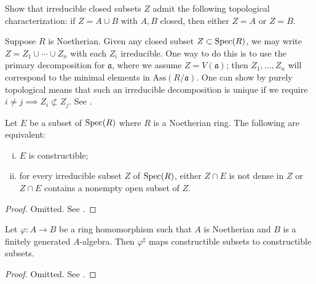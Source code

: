 \begin{exercise}
	Show that irreducible closed subsets $Z$ admit the following topological characterization: if $Z = A \cup B$ with $A,B$ closed, then either $Z=A$ or $Z=B$.
\end{exercise}

Suppose $R$ is Noetherian. Given any closed subset $Z \subset \operatorname{Spec}(R)$, we may write $Z = Z_1 \cup \cdots \cup Z_n$ with each $Z_i$ irreducible. One way to do this is to use the primary decomposition for $\mathfrak{a}$, where we assume $Z = V(\mathfrak{a})$; then $Z_1, \ldots, Z_n$ will correspond to the minimal elements in $\text{Ass}(R/\mathfrak{a})$. One can show by purely topological means that such an irreducible decomposition is unique if we require $i \neq j \implies Z_i \not\subset Z_j$. See \cite[I.1.5]{Har77}.

\begin{lemma}\label{prop:char-constructible}
	Let $E$ be a subset of $\operatorname{Spec}(R)$ where $R$ is a Noetherian ring. The following are equivalent:
	\begin{enumerate}[(i)]
		\item $E$ is constructible;
		\item for every irreducible subset $Z$ of $\operatorname{Spec}(R)$, either $Z \cap E$ is not dense in $Z$ or $Z \cap E$ contains a nonempty open subset of $Z$.
	\end{enumerate}
\end{lemma}
\begin{proof}
	Omitted. See \cite[(6.C)]{Mat80}.
\end{proof}

\begin{theorem}[C.\ Chevalley]\label{prop:Chevalley}
	Let $\varphi: A \to B$ be a ring homomorphism such that $A$ is Noetherian and $B$ is a finitely generated $A$-algebra. Then $\varphi^\sharp$ maps constructible subsets to constructible subsets.
\end{theorem}
\begin{proof}
	Omitted. See \cite[(6.E)]{Mat80}.
\end{proof}

